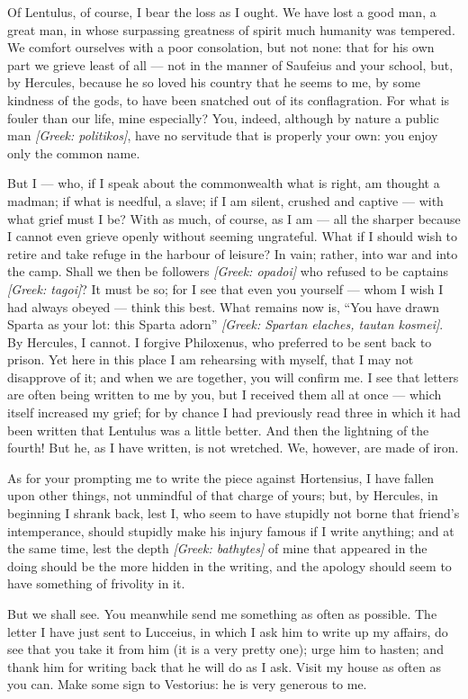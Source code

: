

 Of Lentulus, of course, I bear the loss as I ought. We have lost a good man, a great man, in whose surpassing greatness of spirit much humanity was tempered. We comfort ourselves with a poor consolation, but not none: that for his own part we grieve least of all --- not in the manner of Saufeius and your school, but, by Hercules, because he so loved his country that he seems to me, by some kindness of the gods, to have been snatched out of its conflagration. For what is fouler than our life, mine especially? You, indeed, although by nature a public man \textit{[Greek: politikos]}, have no servitude that is properly your own: you enjoy only the common name.

 But I --- who, if I speak about the commonwealth what is right, am thought a madman; if what is needful, a slave; if I am silent, crushed and captive --- with what grief must I be? With as much, of course, as I am --- all the sharper because I cannot even grieve openly without seeming ungrateful. What if I should wish to retire and take refuge in the harbour of leisure? In vain; rather, into war and into the camp. Shall we then be followers \textit{[Greek: opadoi]} who refused to be captains \textit{[Greek: tagoi]}? It must be so; for I see that even you yourself --- whom I wish I had always obeyed --- think this best. What remains now is, ``You have drawn Sparta as your lot: this Sparta adorn'' \textit{[Greek: Spartan elaches, tautan kosmei]}. By Hercules, I cannot. I forgive Philoxenus, who preferred to be sent back to prison. Yet here in this place I am rehearsing with myself, that I may not disapprove of it; and when we are together, you will confirm me. I see that letters are often being written to me by you, but I received them all at once --- which itself increased my grief; for by chance I had previously read three in which it had been written that Lentulus was a little better. And then the lightning of the fourth! But he, as I have written, is not wretched. We, however, are made of iron.

 As for your prompting me to write the piece against Hortensius, I have fallen upon other things, not unmindful of that charge of yours; but, by Hercules, in beginning I shrank back, lest I, who seem to have stupidly not borne that friend's intemperance, should stupidly make his injury famous if I write anything; and at the same time, lest the depth \textit{[Greek: bathytes]} of mine that appeared in the doing should be the more hidden in the writing, and the apology should seem to have something of frivolity in it.

 But we shall see. You meanwhile send me something as often as possible. The letter I have just sent to Lucceius, in which I ask him to write up my affairs, do see that you take it from him (it is a very pretty one); urge him to hasten; and thank him for writing back that he will do as I ask. Visit my house as often as you can. Make some sign to Vestorius: he is very generous to me.
